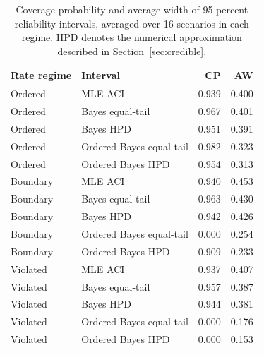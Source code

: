 \begin{table}[htbp]
\centering
\caption{Coverage probability and average width of 95 percent reliability intervals, averaged over 16 scenarios in each regime. HPD denotes the numerical approximation described in Section~\ref{sec:credible}.}\label{tab:intervals}
\small
\begin{tabular}{llrr}
\toprule
Rate regime & Interval & CP & AW \\
\midrule
Ordered & MLE ACI & 0.939 & 0.400 \\
Ordered & Bayes equal-tail & 0.967 & 0.401 \\
Ordered & Bayes HPD & 0.951 & 0.391 \\
Ordered & Ordered Bayes equal-tail & 0.982 & 0.323 \\
Ordered & Ordered Bayes HPD & 0.954 & 0.313 \\
Boundary & MLE ACI & 0.940 & 0.453 \\
Boundary & Bayes equal-tail & 0.963 & 0.430 \\
Boundary & Bayes HPD & 0.942 & 0.426 \\
Boundary & Ordered Bayes equal-tail & 0.000 & 0.254 \\
Boundary & Ordered Bayes HPD & 0.909 & 0.233 \\
Violated & MLE ACI & 0.937 & 0.407 \\
Violated & Bayes equal-tail & 0.957 & 0.387 \\
Violated & Bayes HPD & 0.944 & 0.381 \\
Violated & Ordered Bayes equal-tail & 0.000 & 0.176 \\
Violated & Ordered Bayes HPD & 0.000 & 0.153 \\
\bottomrule
\end{tabular}
\end{table}
